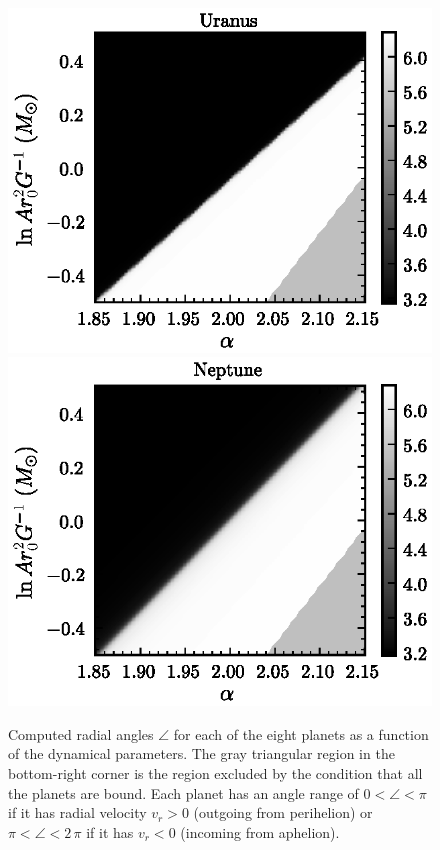 \begin{figure}
\includegraphics[height=.2\textheight]{figs_solarsystem/phase_Uranus.ps}
\includegraphics[height=.2\textheight]{figs_solarsystem/phase_Neptune.ps}
\caption[Radial angles for each of the planets as a function of the
  dynamical parameters]{Computed radial angles $\angle$ for each of
  the eight planets as a function of the dynamical parameters. The
  gray triangular region in the bottom-right corner is the region
  excluded by the condition that all the planets are bound.  Each
  planet has an angle range of $0<\angle<\pi$ if it has radial
  velocity $v_r>0$ (outgoing from perihelion) or $\pi<\angle<2\,\pi$
  if it has $v_r<0$ (incoming from
  aphelion).}\label{fig:anglesPlanets}
\end{figure}

